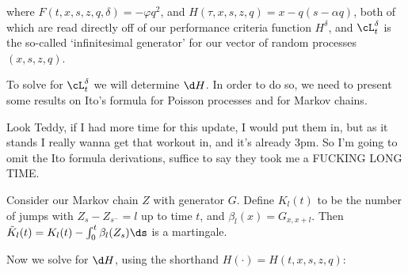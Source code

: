 \documentclass[12pt]{article}
\begin{document}
where $F(t,x,s,z,q,\delta) = -\varphi q^2$, and $H(\tau,x,s,z,q) = x - q(s-\alpha q)$, both of which are read directly off of our performance criteria function $H^\delta$, and $\cL^{\delta}_t$ is the so-called `infinitesimal generator' for our vector of random processes $(x,s,z,q)$. 

To solve for $\cL^{\delta}_t$ we will determine $\d H$. In order to do so, we need to present some results on Ito's formula for Poisson processes and for Markov chains.

Look Teddy, if I had more time for this update, I would put them in, but as it stands I really wanna get that workout in, and it's already 3pm. So I'm going to omit the Ito formula derivations, suffice to say they took me a FUCKING LONG TIME. 

Consider our Markov chain $Z$ with generator $G$. Define $K_l(t)$ to be the number of jumps with $Z_s - Z_{s^-} = l$ up to time $t$, and $\beta_l(x) = G_{x,x+l}$. Then $\tilde{K}_l(t) = K_l(t) - \int_0^t \beta_l(Z_s)\ds$ is a martingale. 

Now we solve for $\d H$, using the shorthand $H(\cdot) = H(t,x,s,z,q)$:
\end{document}
